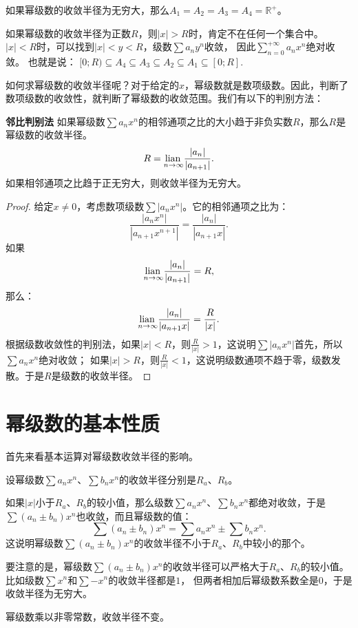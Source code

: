 \documentclass[12pt,UTF8]{ctexbook}
\begin{document}
\begin{appendix}
如果幂级数的收敛半径为无穷大，那么$A_1 = A_2 = A_3 = A_4 = \mathbb{R}^+$。

如果幂级数的收敛半径为正数$R$，则$|x|>R$时，肯定不在任何一个集合中。$|x|<R$时，可以找到$|x|<y<R$，级数$\sum a_n y^n$收敛，
因此$\sum_{n=0}^{+\infty} a_n x^n$绝对收敛。
也就是说：
$[0;R) \subseteq A_4\subseteq A_3 \subseteq A_2\subseteq A_1 \subseteq [0;R].$

如何求幂级数的收敛半径呢？对于给定的$x$，幂级数就是数项级数。因此，判断了数项级数的收敛性，就判断了幂级数的收敛范围。我们有以下的判别方法：

\begin{tm}{\textbf{邻比判别法}}
    如果幂级数$\sum a_n x^n$的相邻通项之比的大小趋于非负实数$R$，那么$R$是幂级数的收敛半径。
    $$ R = \underset{n\to\infty}{\operatorname{lian}\,} \frac{|a_n|}{|a_{n+1}|}. $$
    如果相邻通项之比趋于正无穷大，则收敛半径为无穷大。
\end{tm}

\begin{proof}
    给定$x\neq 0$，考虑数项级数$\sum |a_n x^n|$。它的相邻通项之比为：
    $$ \frac{|a_n x^n|}{|a_{n+1} x^{n+1}|} = \frac{|a_n|}{|a_{n+1}x|}. $$
    如果
    $$ \underset{n\to\infty}{\operatorname{lian}\,} \frac{|a_n|}{|a_{n+1}|} = R,$$
    那么：
    $$ \underset{n\to\infty}{\operatorname{lian}\,} \frac{|a_n|}{|a_{n+1}x|} = \frac{R}{|x|}.$$
    根据级数收敛性的判别法，如果$|x|<R$，则$\frac{R}{|x|} > 1$，这说明$\sum |a_n x^n|$首先，所以$\sum a_n x^n$绝对收敛；
    如果$|x|>R$，则$\frac{R}{|x|} < 1$，这说明级数通项不趋于零，级数发散。于是$R$是级数的收敛半径。
\end{proof}

\section{幂级数的基本性质}

首先来看基本运算对幂级数收敛半径的影响。

设幂级数$\sum a_n x^n$、$\sum b_n x^n$的收敛半径分别是$R_a$、$R_b$。

如果$|x|$小于$R_a$、$R_b$的较小值，那么级数$\sum a_n x^n$、$\sum b_n x^n$都绝对收敛，于是
$\sum (a_n \pm b_n) x^n$也收敛，而且幂级数的值：
$$\sum (a_n \pm b_n) x^n = \sum a_n x^n \pm \sum b_n x^n.$$
这说明幂级数$\sum (a_n \pm b_n) x^n$的收敛半径不小于$R_a$、$R_b$中较小的那个。

要注意的是，幂级数$\sum (a_n \pm b_n) x^n$的收敛半径可以严格大于$R_a$、$R_b$的较小值。比如级数$\sum x^n$和$\sum -x^n$的收敛半径都是$1$，
但两者相加后幂级数系数全是$0$，于是收敛半径为无穷大。

幂级数乘以非零常数，收敛半径不变。


\end{appendix}
\end{document}
